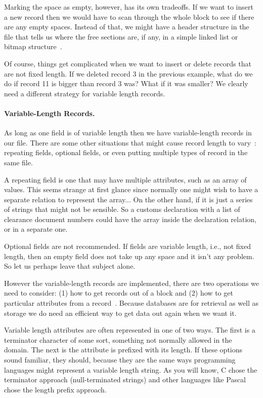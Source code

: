 Marking the space as empty, however, has its own tradeoffs. If we want to insert a new record then we would have to scan through the whole block to see if there are any empty spaces. Instead of that, we might have a header structure in the file that tells us where the free sections are, if any, in a simple linked list or bitmap structure~\cite{dsc}. 

Of course, things get complicated when we want to insert or delete records that are not fixed length. If we deleted record 3 in the previous example, what do we do if record 11 is bigger than record 3 was? What if it was smaller? We clearly need a different strategy for variable length records.



\paragraph{Variable-Length Records.}

As long as one field is of variable length then we have variable-length records in our file. There are some other situations that might cause record length to vary~\cite{fds}: repeating fields, optional fields, or even putting multiple types of record in the same file. 

A repeating field is one that may have multiple attributes, such as an array of values. This seems strange at first glance since normally one might wish to have a separate relation to represent the array... On the other hand, if it is just a series of strings that might not be sensible. So a customs declaration with a list of clearance document numbers could have the array inside the declaration relation, or in a separate one.

Optional fields are not recommended. If fields are variable length, i.e., not fixed length, then an empty field does not take up any space and it isn't any problem. So let us perhaps leave that subject alone. 

However the variable-length records are implemented, there are two operations we need to consider: (1) how to get records out of a block and (2) how to get particular attributes from a record~\cite{dsc}. Because databases are for retrieval as well as storage we do need an efficient way to get data out again when we want it.

Variable length attributes are often represented in one of two ways. The first is a terminator character of some sort, something not normally allowed in the domain. The next is the attribute is prefixed with its length. If these options sound familiar, they should, because they are the same ways programming languages might represent a variable length string. As you will know, C chose the terminator approach (null-terminated strings) and other languages like Pascal chose the length prefix approach.

